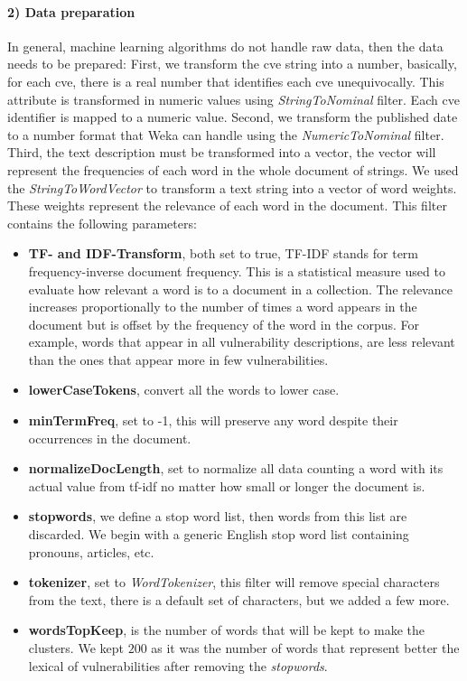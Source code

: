 \paragraph{2) Data preparation}
In general, machine learning algorithms do not handle raw data, then the data needs to be prepared:
First, we transform the \gls{cve} string into a number, basically, for each \gls{cve}, there is a real number that identifies each \gls{cve} unequivocally. 
This attribute is transformed in numeric values using \emph{StringToNominal} filter. 
Each \gls{cve} identifier is mapped to a numeric value.
Second, we transform the published date to a number format that Weka can handle using the \emph{NumericToNominal} filter.
Third, the text description must be transformed into a vector, the vector will represent the frequencies of each word in the whole document of strings. 
We used the \emph{StringToWordVector} to transform a text string into a vector of word weights.
These weights represent the relevance of each word in the document.
This filter contains the following parameters:
\begin{itemize}
\item \textbf{TF- and IDF-Transform}, both set to true, TF-IDF stands for term frequency-inverse document frequency. 
This is a statistical measure used to evaluate how relevant a word is to a document in a collection. 
The relevance increases proportionally to the number of times a word appears in the document but is offset by the frequency of the word in the corpus. 
For example, words that appear in all vulnerability descriptions, are less relevant than the ones that appear more in few vulnerabilities.
\item \textbf{lowerCaseTokens}, convert all the words to lower case.
\item \textbf{minTermFreq}, set to -1, this will preserve any word despite their occurrences in the document.
\item \textbf{normalizeDocLength}, set to normalize all data counting a word with its actual value from tf-idf no matter how small or longer the document is.
\item \textbf{stopwords}, we define a stop word list, then words from this list are discarded. We begin with a generic English stop word list containing pronouns, articles, etc. 
\item \textbf{tokenizer}, set to \emph{WordTokenizer}, this filter will remove special characters from the text, there is a default set of characters, but we added a few more.
\item \textbf{wordsTopKeep}, is the number of words that will be kept to make the clusters. We kept $200$ as it was the number of words that represent better the lexical of vulnerabilities after removing the \emph{stopwords}.
\end{itemize}


